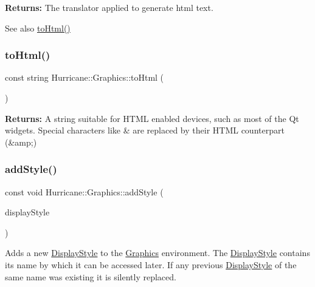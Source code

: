 {\bfseries Returns\+:} The translator applied to generate html text. \begin{DoxySeeAlso}{See also}
\hyperlink{classHurricane_1_1Graphics_a51b3772138b33a85204abbee08898987}{to\+Html()} 
\end{DoxySeeAlso}
\mbox{\label{classHurricane_1_1Graphics_a51b3772138b33a85204abbee08898987}} 
\subsubsection{\texorpdfstring{to\+Html()}{toHtml()}}
{\footnotesize\ttfamily const string Hurricane\+::\+Graphics\+::to\+Html (\begin{DoxyParamCaption}\item[{const string \&}]{ }\end{DoxyParamCaption})\hspace{0.3cm}{\ttfamily [static]}}

{\bfseries Returns\+:} A string suitable for H\+T\+ML enabled devices, such as most of the Qt widgets. Special characters like {\ttfamily \textquotesingle{}\&\textquotesingle{}} are replaced by their H\+T\+ML counterpart ({\ttfamily \&amp};) \mbox{\label{classHurricane_1_1Graphics_ac64dd095224b3f9dfbbdcfc242b11a77}} 
\subsubsection{\texorpdfstring{add\+Style()}{addStyle()}}
{\footnotesize\ttfamily const void Hurricane\+::\+Graphics\+::add\+Style (\begin{DoxyParamCaption}\item[{\hyperlink{classHurricane_1_1DisplayStyle}{Display\+Style} $\ast$}]{display\+Style }\end{DoxyParamCaption})\hspace{0.3cm}{\ttfamily [static]}}

Adds a new \hyperlink{classHurricane_1_1DisplayStyle}{Display\+Style} to the \hyperlink{classHurricane_1_1Graphics}{Graphics} environment. The \hyperlink{classHurricane_1_1DisplayStyle}{Display\+Style} contains it\textquotesingle{}s name by which it can be accessed later. If any previous \hyperlink{classHurricane_1_1DisplayStyle}{Display\+Style} of the same name was existing it is silently replaced. \mbox{\label{classHurricane_1_1Graphics_acb9975e354d7c802fa3064ceb800db90}} 
